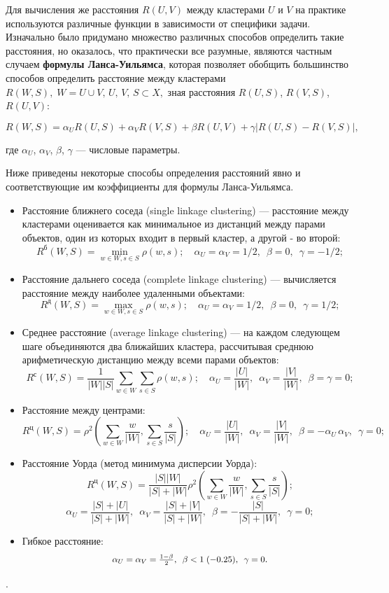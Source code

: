 \documentclass[10pt]{article}
\begin{document}
Для вычисления же расстояния $R(U, V)$ между кластерами $U$ и $V$ на практике используются различные функции в зависимости от специфики задачи.
Изначально было придумано множество различных способов определить такие расстояния, но оказалось, что практически все разумные, являются частным случаем \textbf{формулы Ланса-Уильямса}, которая позволяет обобщить большинство способов определить расстояние между кластерами $ R(W, S),\; W = U \cup V,\, U,\, V,\, S \subset X, $ зная расстояния $R(U, S)$, $R(V, S)$, $R(U, V)$: 
	
	$$ R(W, S) = \alpha_{U} R(U, S) + \alpha_{V} R(V, S) + \beta R(U, V) + \gamma|R(U, S) - R(V, S)|,$$
	
	где $\alpha_{U}$, $\alpha_{V}$, $\beta$, $\gamma$ --- числовые параметры.
	

Ниже приведены некоторые способы определения расстояний явно и соответствующие им коэффициенты для формулы Ланса-Уильямса. 
\begin{itemize}
	\item Расстояние ближнего соседа (single linkage clustering) --- расстояние между кластерами оценивается как минимальное из дистанций между парами объектов, один из которых входит в первый кластер, а другой - во второй:
	$$R^{\text{б}}(W, S) = \min_{w \in W, s \in S} \rho(w, s); \quad \alpha_U=\alpha_V=1/2,\enspace \beta=0,\enspace \gamma=-1/2;$$
	\item Расстояние дальнего соседа (complete linkage clustering) --- вычисляется расстояние между наиболее удаленными объектами:
	$$R^{\text{д}}(W, S) = \max_{w \in W, s \in S} \rho(w, s); \quad \alpha_U=\alpha_V=1/2,\enspace \beta=0,\enspace \gamma=1/2;$$
	\item Среднее расстояние (average linkage clustering) --- на каждом следующем шаге объединяются два ближайших кластера, рассчитывая среднюю арифметическую дистанцию между всеми парами объектов:
	$$R^{\text{с}}(W, S) = \frac{1}{ |W| |S| } \sum_{w \in W} \sum_{s \in S} \rho(w, s); \quad \alpha_U=\frac{|U|}{|W|},\enspace \alpha_V=\frac{|V|}{|W|},\enspace \beta=\gamma=0;$$
	
	\item Расстояние между центрами:
	$$R^{\text{ц}}(W, S) = \rho^2 \left( \sum_{w \in W} \frac{w}{|W|}, \sum_{s \in S} \frac{s}{|S|}\right); \quad
	\alpha_U=\frac{|U|}{|W|},\enspace \alpha_V=\frac{|V|}{|W|},\enspace \beta= -\alpha_U \,\alpha_V,\enspace \gamma=0;$$
	\item Расстояние Уорда (метод минимума дисперсии Уорда):
	$$R^{\text{ц}}(W, S) = \frac{|S| |W|}{|S| + |W|} \rho^2 \left( \sum_{w \in W} \frac{w}{|W|}, \sum_{s \in S} \frac{s}{|S|}\right);$$  
	$$\alpha_U=\frac{|S|+|U|}{|S|+|W|},\enspace \alpha_V=\frac{|S|+|V|}{|S|+|W|},\enspace \beta= -\frac{|S|}{|S|+|W|},\enspace \gamma=0;$$
	
	\item Гибкое расстояние: $$\scalebox{0.9}{$\alpha_U=\alpha_V=\frac{1-\beta}{2},\enspace \beta<1 \;(-0.25),\enspace \gamma=0$}.$$
\end{itemize}.
\end{document}
